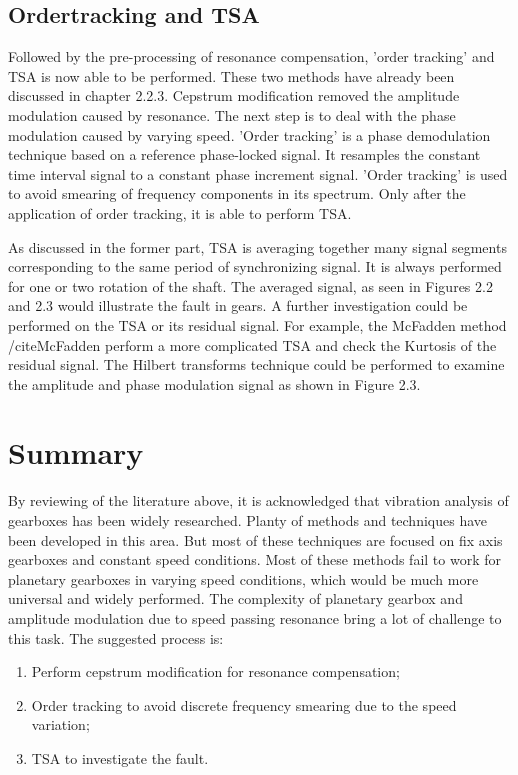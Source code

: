 \subsection{Ordertracking and TSA}

Followed by the pre-processing of resonance compensation, 'order tracking' and TSA is now able to be performed. These two methods have already been discussed in chapter 2.2.3. Cepstrum modification removed the amplitude modulation caused by resonance. The next step is to deal with the phase modulation caused by varying speed. 'Order tracking' is a phase demodulation technique based on a reference phase-locked signal. It resamples the constant time interval signal to a constant phase increment signal. 'Order tracking' is used to avoid smearing of frequency components in its spectrum. Only after the application of order tracking, it is able to perform TSA.

As discussed in the former part, TSA is averaging together many signal segments corresponding to the same period of synchronizing signal. It is always performed for one or two rotation of the shaft. The averaged signal, as seen in Figures 2.2 and 2.3 would illustrate the fault in gears. A further investigation could be performed on the TSA or its residual signal. For example, the McFadden method /cite{McFadden} perform a more complicated TSA and check the Kurtosis of the residual signal. The Hilbert transforms technique \cite{mc4} could be performed to examine the amplitude and phase modulation signal as shown in Figure 2.3.

\section{Summary}

By reviewing of the literature above, it is acknowledged that vibration analysis of gearboxes has been widely researched. Planty of methods and techniques have been developed in this area. But most of these techniques are focused on fix axis gearboxes and constant speed conditions. Most of these methods fail to work for planetary gearboxes in varying speed conditions, which would be much more universal and widely performed. The complexity of planetary gearbox and amplitude modulation due to speed passing resonance bring a lot of challenge to this task. The suggested process is:

\begin{enumerate}
	\item Perform cepstrum modification for resonance compensation;
	
	\item Order tracking to avoid discrete frequency smearing due to the speed variation;
	
	\item TSA to investigate the fault.
	
\end{enumerate}

